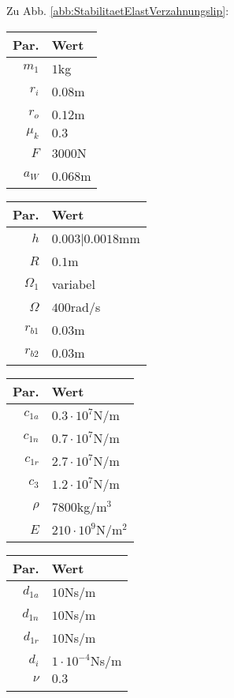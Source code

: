 Zu Abb. \ref{abb:StabilitaetElastVerzahnungslip}: 
\begin{center}
	\begin{tabular}{r|l}
		Par.&Wert\\\hline
		$m_1$&$1$kg\\
		$r_i$&$0.08$m\\
		$r_o$&$0.12$m\\
		$\mu_k$& $0.3$\\
		$F$&$3000$N\\
		$a_{W}$&$0.068$m\\
	\end{tabular}\hfill
	\begin{tabular}{r|l}
		Par.&Wert\\\hline
		$h$&$0.003|0.0018$mm\\
		$R$&$0.1$m\\
		$\Omega_1$&variabel\\
		$\Omega$& $400$rad/s \\
		$r_{b1}$&$0.03$m\\
		$r_{b2}$&$0.03$m\\
	\end{tabular}\hfill
	\begin{tabular}{r|l}
		Par.&Wert\\\hline
		$c_{1a}$&$0.3\cdot10^{7}$N/m\\
		$c_{1n}$&$0.7\cdot10^{7}$N/m\\
		$c_{1r}$&$2.7\cdot10^{7}$N/m\\
		$c_{3}$&$1.2\cdot10^{7}$N/m\\
		$\rho$&$7800$kg/m$^3$\\
		$E$&$210\cdot10^9$N/m$^2$\\
	\end{tabular}\hfill
	\begin{tabular}{r|l}
		Par.&Wert\\\hline
		$d_{1a}$&$10$Ns/m\\
		$d_{1n}$&$10$Ns/m\\
		$d_{1r}$&$10$Ns/m\\
		$d_i$ &$1\cdot10^{-4}$Ns/m\\
		$\nu$&$0.3$\\
		&
	\end{tabular}
\end{center}

